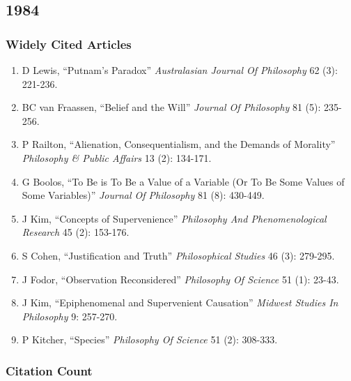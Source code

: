 \documentclass[
  10pt,
  letterpaper,
  DIV=11,
  numbers=noendperiod,
  twoside]{scrartcl}
\providecommand{\tightlist}{%
  \setlength{\itemsep}{0pt}\setlength{\parskip}{0pt}}\usepackage{longtable,booktabs,array}
\begin{document}
\newpage

\subsection{1984}\label{section-8}

\subsubsection*{Widely Cited Articles}\label{widely-cited-articles-8}

\begin{enumerate}
\def\labelenumi{\arabic{enumi}.}
\tightlist
\item
  D Lewis, ``Putnam's Paradox'' \emph{Australasian Journal Of
  Philosophy} 62 (3): 221-236.
\item
  BC van Fraassen, ``Belief and the Will'' \emph{Journal Of Philosophy}
  81 (5): 235-256.
\item
  P Railton, ``Alienation, Consequentialism, and the Demands of
  Morality'' \emph{Philosophy \& Public Affairs} 13 (2): 134-171.
\item
  G Boolos, ``To Be is To Be a Value of a Variable (Or To Be Some Values
  of Some Variables)'' \emph{Journal Of Philosophy} 81 (8): 430-449.
\item
  J Kim, ``Concepts of Supervenience'' \emph{Philosophy And
  Phenomenological Research} 45 (2): 153-176.
\item
  S Cohen, ``Justification and Truth'' \emph{Philosophical Studies} 46
  (3): 279-295.
\item
  J Fodor, ``Observation Reconsidered'' \emph{Philosophy Of Science} 51
  (1): 23-43.
\item
  J Kim, ``Epiphenomenal and Supervenient Causation'' \emph{Midwest
  Studies In Philosophy} 9: 257-270.
\item
  P Kitcher, ``Species'' \emph{Philosophy Of Science} 51 (2): 308-333.
\end{enumerate}

\subsubsection*{Citation Count}\label{citation-count-8}
\end{document}
